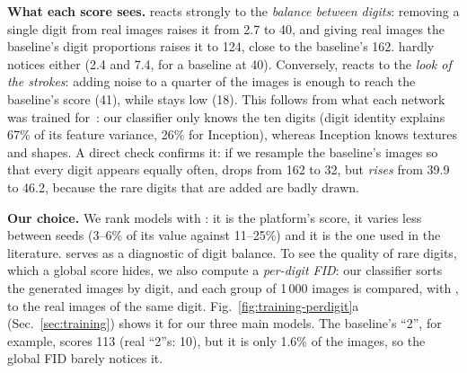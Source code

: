 \textbf{What each score sees.} \fcnn{} reacts strongly to the \emph{balance between digits}: removing a single digit from
real images raises it from 2.7 to 40, and giving real images the baseline's digit proportions raises it to 124, close to
the baseline's 162. \finc{} hardly notices either (2.4 and 7.4, for a baseline at 40). Conversely, \finc{} reacts to the
\emph{look of the strokes}: adding noise to a quarter of the images is enough to reach the baseline's score (41), while
\fcnn{} stays low (18). This follows from what each network was trained for~\cite{kynkaanniemi2023}:
our classifier only knows the ten digits (digit identity explains 67\% of its feature variance, 26\% for Inception),
whereas Inception knows textures and shapes. A direct check confirms it: if we resample the baseline's images so that every
digit appears equally often, \fcnn{} drops from 162 to 32, but \finc{} \emph{rises} from 39.9 to 46.2, because the rare digits
that are added are badly drawn.

\textbf{Our choice.} We rank models with \finc{}: it is the platform's score, it varies less between seeds (3--6\% of its
value against 11--25\%) and it is the one used in the literature. \fcnn{} serves as a diagnostic of digit balance. To see
the quality of rare digits, which a global score hides, we also compute a \emph{per-digit FID}: our classifier sorts the
generated images by digit, and each group of 1\,000 images is compared, with \finc{}, to the real images of the same
digit. Fig.~\ref{fig:training-perdigit}a (Sec.~\ref{sec:training}) shows it for our three main models. The baseline's
``2'', for example, scores 113 (real ``2''s: 10), but it is only 1.6\% of the images, so the global FID barely notices it.

